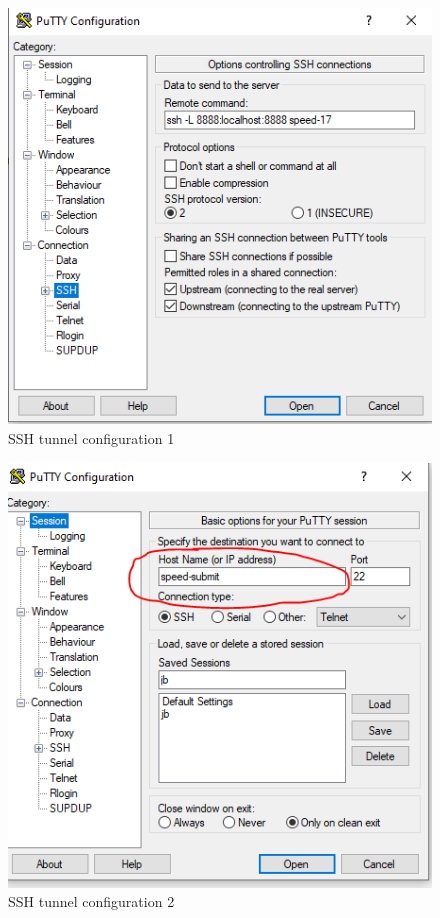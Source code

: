 \begin{figure}[ht]
	\centering
		\includegraphics[scale=0.55]{images/putty1}
	\caption{SSH tunnel configuration 1}
	\label{fig:putty1}
\end{figure}



\begin{figure}[ht]
	\centering
		\includegraphics[scale=0.90]{images/putty2}
	\caption{SSH tunnel configuration 2}
	\label{fig:putty2}
\end{figure}


